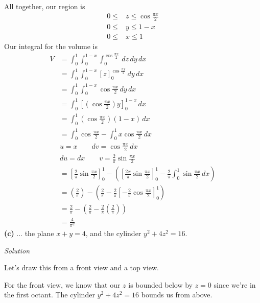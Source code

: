 \documentclass{article}
\newcommand{\lrp}[1]{\left( #1 \right)}
\newcommand{\lrb}[1]{\left[ #1 \right]}
\newcommand{\Solution}{\textit{Solution}}
\begin{document}
All together, our region is
\begin{align*}
    0\leq &z \leq \cos \frac{\pi x}{2}\\
    0\leq &y \leq 1-x\\
    0\leq & x \leq 1
\end{align*}
Our integral for the volume is
\begin{align*}
    V&=\int_0^1\int_0^{1-x}\int_0^{\cos\frac{\pi x}{2}}\,dz\,dy\,dx\\
    &= \int_0^1\int_0^{1-x}\lrb{z}_0^{\cos\frac{\pi x}{2}}\,dy\,dx\\
    &= \int_0^1 \int_0^{1-x}\cos\frac{\pi x}{2}\,dy\, dx\\
    &=\int_0^1\lrb{\lrp{\cos \frac{\pi x}{2}}y}_0^{1-x}\,dx\\
    &=\int_0^1 \lrp{\cos \frac{\pi x}{2}}\lrp{1-x}\,dx\\
    &=\int_0^1\cos\frac{\pi x}{2}-\int_0^1 x\cos \frac{\pi x}{2}\,dx\\
    &u=x\hspace{2em}dv=\cos\frac{\pi x}{2}\,dx\\
    &du=dx\hspace{2em}v=\frac{2}{\pi}\sin\frac{\pi x}{2}\\
    &=\lrb{\frac{2}{\pi}\sin\frac{\pi x}{2}}_0^1 -\lrp{\lrb{\frac{2x}{\pi}\sin\frac{\pi x}{2}}_0^1-\frac{2}{\pi}\int_0^1 \sin \frac{\pi x}{2}\,dx}\\
    &=\lrp{\frac{2}{\pi}}-\lrp{\frac{2}{\pi}-\frac{2}{\pi}\lrb{-\frac{2}{\pi}\cos\frac{\pi x}{2}}_0^1}\\
    &=\frac{2}{\pi}-\lrp{\frac{2}{\pi}-\frac{2}{\pi}\lrp{\frac{2}{\pi}}}\\
    &=\boxed{\frac{4}{\pi^2}}
\end{align*}
\textbf{(c)} ... the plane $x+y=4$, and the cylinder $y^2+4z^2=16$.

\Solution

Let's draw this from a front view and a top view.

For the front view, we know that our $z$ is bounded below by $z=0$ since we're in the first octant. The cylinder $y^2+4z^2=16$ bounds us from above.
\end{document}
